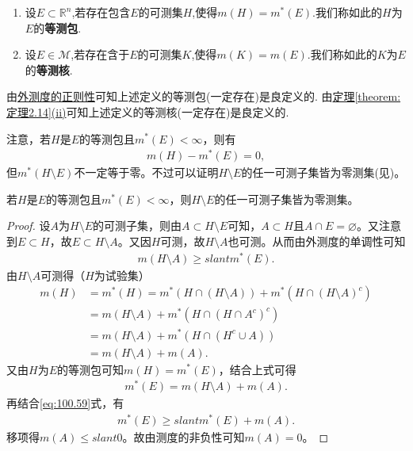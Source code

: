 \documentclass[../../main.tex]{subfiles}
\begin{document}
\begin{definition}[等测包与等测核]
\begin{enumerate}
\item 设$E\subset \mathbb{R}^n$,若存在包含$E$的可测集$H$,使得$m(H)=m^*(E)$.我们称如此的$H$为$E$的\textbf{等测包}.

\item 设$E\in \mathscr{M}$,若存在含于$E$的可测集$K$,使得$m(K)=m(E)$.我们称如此的$K$为$E$的\textbf{等测核}.
\end{enumerate}
\end{definition}
\begin{note}
由\hyperref[theorem:外测度的正则性]{外测度的正则性}可知上述定义的等测包(一定存在)是良定义的.
由\hyperref[theorem:定理2.14]{定理\ref{theorem:定理2.14}(ii)}可知上述定义的等测核(一定存在)是良定义的.
\end{note}
\begin{remark}
注意，若\(H\)是\(E\)的等测包且\(m^*(E)<\infty\)，则有
\begin{align*}
m(H) - m^*(E) = 0,
\end{align*}
但\(m^*(H\setminus E)\)不一定等于零。不过可以证明\(H\setminus E\)的任一可测子集皆为零测集(见)。
\end{remark}

\begin{proposition}\label{proposition:等测包与原集合差的可测子集必为零测集}
若\(H\)是\(E\)的等测包且\(m^*(E)<\infty\)，则\(H\setminus E\)的任一可测子集皆为零测集。
\end{proposition}
\begin{proof}
设\(A\)为\(H\setminus E\)的可测子集，则由\(A\subset H\setminus E\)可知，\(A\subset H\)且\(A\cap E=\varnothing\)。又注意到\(E\subset H\)，故\(E\subset H\setminus A\)。又因\(H\)可测，故\(H\setminus A\)也可测。从而由外测度的单调性可知
\begin{align}
m(H\setminus A)\geqslant slant m^*(E).\label{eq:100.59}
\end{align}
由\(H\setminus A\)可测得（\(H\)为试验集）
\begin{align*}
m(H)&=m^*(H)=m^*(H\cap(H\setminus A))+m^*(H\cap(H\setminus A)^c)\\
&=m(H\setminus A)+m^*(H\cap(H\cap A^c)^c)
\\
&=m(H\setminus A)+m^*(H\cap(H^c\cup A))\\
&=m(H\setminus A)+m(A).
\end{align*}
又由\(H\)为\(E\)的等测包可知\(m(H)=m^*(E)\)，结合上式可得
\begin{align*}
m^*(E)=m(H\setminus A)+m(A).
\end{align*}
再结合\eqref{eq:100.59}式，有
\begin{align*}
m^*(E)\geqslant slant m^*(E)+m(A).
\end{align*}
移项得\(m(A)\leqslant slant0\)。故由测度的非负性可知\(m(A)=0\)。
\end{proof}
\end{document}

